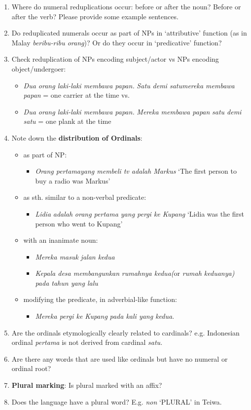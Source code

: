 \documentclass[output=paper]{LSP/langsci}
\begin{document}
\begin{enumerate}
\item Where do numeral reduplications occur: before or after the noun? Before or after the verb? Please provide some example sentences.
\item Do reduplicated numerals occur as part of NPs in `attributive' function (as in Malay \textit{beribu-ribu orang})? Or do they occur in `predicative' function? 
\item  Check reduplication of NPs encoding subject/actor vs NPs encoding object/undergoer: 
\begin{itemize}
\item \textit{Dua orang laki-laki membawa papan.} \textit{Satu demi satu}\textit{mereka membawa papan} = one carrier at the time vs. 
\item \textit{Dua orang laki-laki membawa papan.} \textit{Mereka membawa papan} \textit{satu demi satu} = one plank at the time
\end{itemize}
\item  Note down the \textbf{distribution of Ordinals}: 
\begin{itemize}
\item as part of NP: 
\begin{itemize}
\item \textit{Orang pertama}\textit{yang membeli tv adalah Markus} `The first person to buy a radio was Markus'  
\end{itemize}
\item as sth. similar to a non-verbal predicate: 
\begin{itemize}
\item \textit{Lidia} \textit{adalah} \textit{orang pertama yang pergi ke Kupang} `Lidia was the first person who went to Kupang' 
\end{itemize}
\item with an inanimate noun: 
\begin{itemize}
\item \textit{Mereka masuk} \textit{jalan kedua}
\item \textit{Kepala desa membangunkan} \textit{rumahnya kedua}\textit{(}or \textit{rumah keduanya}\textit{) pada tahun yang lalu } 
\end{itemize}
\item modifying the predicate, in adverbial-like function: 
\begin{itemize}
\item \textit{Mereka pergi ke Kupang} \textit{pada kali yang kedua}.
\end{itemize}
\end{itemize}
\item  Are the ordinals etymologically clearly related to cardinals? e.g. Indonesian ordinal \textit{pertama} is not derived from cardinal \textit{satu.}
\item  Are there any words that are used like ordinals but have no numeral or ordinal root?
\item  \textbf{Plural marking}: Is plural marked with an affix? 
\item  Does the language have a plural word? E.g. \textit{non} `PLURAL' in Teiwa.


\end{enumerate}
\end{document}
